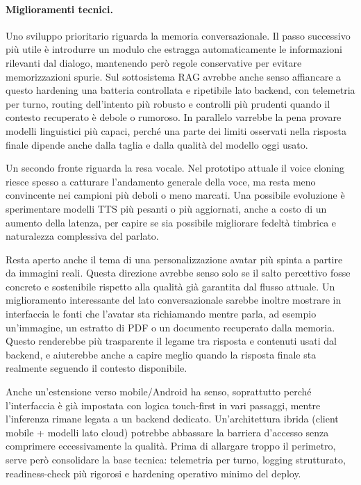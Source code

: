\paragraph{Miglioramenti tecnici.}
Uno sviluppo prioritario riguarda la memoria conversazionale. Il passo successivo più utile è introdurre un modulo che estragga automaticamente le informazioni rilevanti dal dialogo, mantenendo però regole conservative per evitare memorizzazioni spurie. Sul sottosistema RAG avrebbe anche senso affiancare a questo hardening una batteria controllata e ripetibile lato backend, con telemetria per turno, routing dell'intento più robusto e controlli più prudenti quando il contesto recuperato è debole o rumoroso. In parallelo varrebbe la pena provare modelli linguistici più capaci, perché una parte dei limiti osservati nella risposta finale dipende anche dalla taglia e dalla qualità del modello oggi usato.

Un secondo fronte riguarda la resa vocale. Nel prototipo attuale il voice cloning riesce spesso a catturare l'andamento generale della voce, ma resta meno convincente nei campioni più deboli o meno marcati. Una possibile evoluzione è sperimentare modelli TTS più pesanti o più aggiornati, anche a costo di un aumento della latenza, per capire se sia possibile migliorare fedeltà timbrica e naturalezza complessiva del parlato.

Resta aperto anche il tema di una personalizzazione avatar più spinta a partire da immagini reali. Questa direzione avrebbe senso solo se il salto percettivo fosse concreto e sostenibile rispetto alla qualità già garantita dal flusso attuale. Un miglioramento interessante del lato conversazionale sarebbe inoltre mostrare in interfaccia le fonti che l'avatar sta richiamando mentre parla, ad esempio un'immagine, un estratto di PDF o un documento recuperato dalla memoria. Questo renderebbe più trasparente il legame tra risposta e contenuti usati dal backend, e aiuterebbe anche a capire meglio quando la risposta finale sta realmente seguendo il contesto disponibile.

Anche un'estensione verso mobile/Android ha senso, soprattutto perché l'interfaccia è già impostata con logica touch-first in vari passaggi, mentre l'inferenza rimane legata a un backend dedicato. Un'architettura ibrida (client mobile + modelli lato cloud) potrebbe abbassare la barriera d'accesso senza comprimere eccessivamente la qualità. Prima di allargare troppo il perimetro, serve però consolidare la base tecnica: telemetria per turno, logging strutturato, readiness-check più rigorosi e hardening operativo minimo del deploy.

